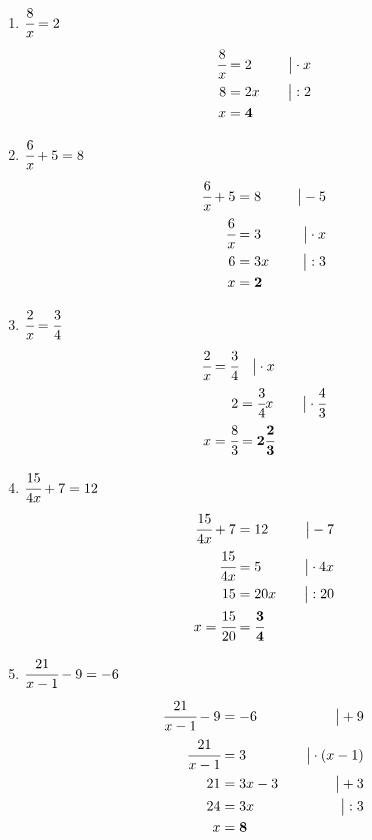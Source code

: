 \documentclass[a4paper,10pt]{article} %
\begin{document}
\begin{enumerate}[label=\alph*)]

  \item \(\cfrac{8}{x} = 2\)
  \[
    \begin{aligned}
      \cfrac{8}{x} &= 2 &\quad\big| \cdot x \\
      8 &= 2x &\quad\big| : 2 \\
      x &= \mathbf{4}
    \end{aligned}
  \]

  \item \(\cfrac{6}{x} + 5 = 8\)
  \[
    \begin{aligned}
      \cfrac{6}{x} + 5 &= 8 &\quad\big| - 5 \\
      \cfrac{6}{x} &= 3 &\quad\big| \cdot x \\
      6 &= 3x &\quad\big| : 3 \\
      x &= \mathbf{2}
    \end{aligned}
  \]

  \item \(\cfrac{2}{x} = \cfrac{3}{4}\)
  \[
    \begin{aligned}
      \cfrac{2}{x} = \cfrac{3}{4} &\quad\big| \cdot x \\
      2 &= \cfrac{3}{4}x &\quad\big| \cdot \cfrac{4}{3} \\
      x = \cfrac{8}{3} &= \mathbf{2\cfrac{2}{3}}
    \end{aligned}
  \]

  \item \(\cfrac{15}{4x} + 7 = 12\)
  \[
    \begin{aligned}
      \cfrac{15}{4x} + 7 &= 12 &\quad\big| - 7 \\
      \cfrac{15}{4x} &= 5 &\quad\big| \cdot 4x \\
      15 &= 20x &\quad\big| : 20 \\
      x = \cfrac{15}{20} &= \mathbf{\cfrac{3}{4}}
    \end{aligned}
  \]

  \item \(\cfrac{21}{x - 1} - 9 = -6\)
  \[
    \begin{aligned}
      \cfrac{21}{x - 1} - 9 &= -6 &\quad\big| + 9 \\
      \cfrac{21}{x - 1} &= 3 &\quad\big| \cdot (x - 1) \\
      21 &= 3x - 3 &\quad\big| + 3 \\
      24 &= 3x &\quad\big| : 3 \\
      x &= \mathbf{8}
    \end{aligned}
  \]


\end{enumerate}
\end{document}
